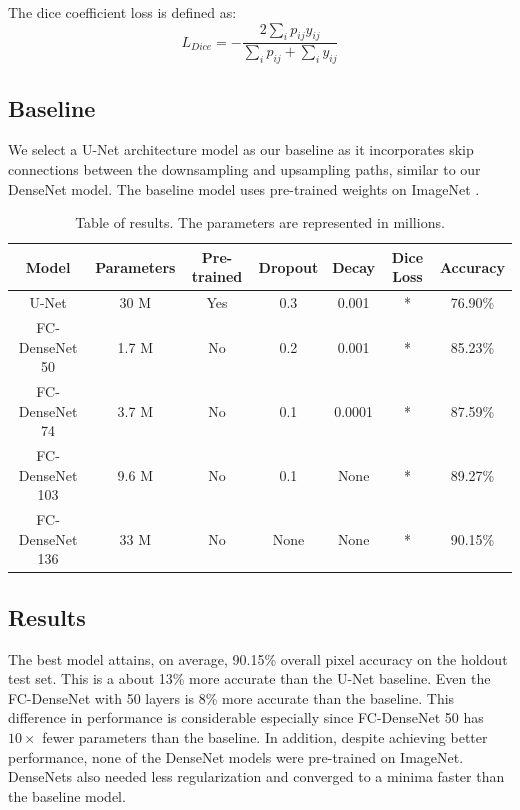 \documentclass{llncs}
\begin{document}
The dice coefficient loss is defined as:
\begin{equation}
L_{Dice} = -\frac{2 \sum_i p_{ij} y_{ij}}{\sum_i p_{ij} + \sum_i y_{ij}}
\end{equation}

\subsection{Baseline}
We select a U-Net \cite{U-Net} architecture model as our baseline as it incorporates skip connections between the downsampling and upsampling paths, similar to our DenseNet model. The baseline model uses pre-trained weights on ImageNet \cite{Imagenet}.   

\setlength{\tabcolsep}{3pt}
\begin{table}
	\centering
	\begin{tabular}{c | c | c | c | c | c | c}
		\hline
		Model & Parameters & Pre-trained & Dropout & Decay & Dice Loss & Accuracy \\ 
		\hline
		U-Net & 30 M & Yes & 0.3 & 0.001 & * & 76.90\% \\ 
		FC-DenseNet 50 & 1.7 M & No & 0.2 & 0.001 & * & 85.23\% \\ 
		FC-DenseNet 74 & 3.7 M & No & 0.1 & 0.0001 & * & 87.59\% \\ 
		FC-DenseNet 103 & 9.6 M & No & 0.1 & None & * & 89.27\% \\
		FC-DenseNet 136 & 33 M & No & None & None & * & 90.15\% \\
	\end{tabular}
	\bigskip
	\caption{Table of results. The parameters are represented in millions.}
\end{table}
\vspace{-4em}

\subsection{Results}
The best model attains, on average, 90.15\% overall pixel accuracy on the holdout test set. This is a about 13\% more accurate than the U-Net baseline. Even the FC-DenseNet with 50 layers is 8\% more accurate than the baseline. This difference in performance is considerable especially since FC-DenseNet 50 has $10 \times$ fewer parameters than the baseline. In addition, despite achieving better performance, none of the DenseNet models were pre-trained on ImageNet. DenseNets also needed less regularization and converged to a minima faster than the baseline model.
\end{document}
